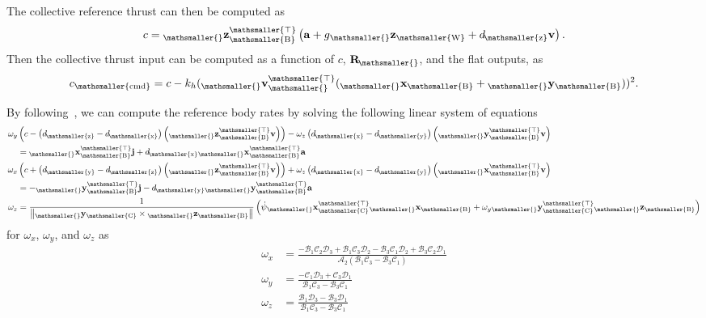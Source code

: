 \documentclass[10pt,a4paper,fleqn]{article}
\newcommand{\vel}[0]{\bVec{v}} %
\newcommand{\acc}[0]{\bVec{a}} %
\newcommand{\jerk}[0]{\bVec{j}} %
\newcommand{\bVec}[1]{\mathbf{#1}}
\newcommand{\norm}[1]{\left\lVert#1\right\rVert}
\newcommand{\vect}[3]{{_{\mathsmaller{\mathrm{#2}}}\mathbf{#1}_{\mathsmaller{\mathrm{#3}}}}} %
\newcommand{\vecttrans}[3]{{_{\mathsmaller{\mathrm{#2}}}\mathbf{#1}_{\mathsmaller{\mathrm{#3}}}^{\mathsmaller{\top}}}} %
\newcommand{\wfr}[0]{\ensuremath{W}} %
\newcommand{\bfr}[0]{\ensuremath{B}} %
\newcommand{\cfr}[0]{\ensuremath{C}} %
\newcommand{\gravacc}[0]{\ensuremath{g}} %
\newcommand{\ori}[1]{\bVec{R}_{\!\mathsmaller{\mathrm{#1}}}} %
\newcommand{\heading}[0]{\psi} %
\newcommand{\bodyrate}[0]{\omega} %
\newcommand{\thrust}[0]{c} %
\newcommand{\horzthrustcoeff}[0]{k_h} %
\newcommand{\dragcoeff}[1]{\ensuremath{d}_{\!\mathsmaller{\mathrm{#1}}}} %
\begin{document}
The collective reference thrust can then be computed as
%
\begin{equation}
	\thrust = \vecttrans{z}{}{\bfr} \left( \acc + \gravacc \vect{z}{}{\wfr} + \dragcoeff{z} \vel \right) .
\end{equation}
%
Then the collective thrust input can be computed as a function of $\thrust$, $\ori{}$, and the flat outputs, as
%
\begin{equation}
	\thrust_{\mathsmaller{\mathrm{cmd}}} = \thrust - \horzthrustcoeff (\vecttrans{v}{}{}( \vect{x}{}{\bfr} + \vect{y}{}{\bfr}))^2 .
\end{equation}

By following~\cite{Faessler18ral}, we can compute the reference body rates by solving the following linear system of equations
%
\begin{align}
	\bodyrate_y & \left( \thrust - \left( \dragcoeff{z} - \dragcoeff{x} \right) \left( \vecttrans{z}{}{\bfr} \vel \right) \right) - \bodyrate_z \left( \dragcoeff{x} - \dragcoeff{y} \right) \left( \vecttrans{y}{}{\bfr} \vel \right) \nonumber \\
	\quad &= \vecttrans{x}{}{\bfr} \jerk + \dragcoeff{x} \vecttrans{x}{}{\bfr} \acc \label{eq:rate_lin_sys_of_eq_x}  \\
	\bodyrate_x & \left( \thrust + \left( \dragcoeff{y} - \dragcoeff{z} \right) \left( \vecttrans{z}{}{\bfr} \vel \right) \right) + \bodyrate_z \left( \dragcoeff{x} - \dragcoeff{y} \right) \left( \vecttrans{x}{}{\bfr} \vel \right) \nonumber \\
	\quad &= -\vecttrans{y}{}{\bfr} \jerk - \dragcoeff{y} \vecttrans{y}{}{\bfr} \acc \label{eq:rate_lin_sys_of_eq_y} \\
	\bodyrate_z &= \frac{1}{\norm{\vect{y}{}{\cfr} \times \vect{z}{}{\bfr}}} \left( \dot{\heading} \vecttrans{x}{}{\cfr} \vect{x}{}{\bfr} + \bodyrate_y \vecttrans{y}{}{\cfr} \vect{z}{}{\bfr} \right) \label{eq:rate_lin_sys_of_eq_z} 
\end{align}
%
for $\bodyrate_x$, $\bodyrate_y$, and $\bodyrate_z$ as
%
\begin{align}
	\bodyrate_x &= \frac{
		- \mathcal{B}_1 \mathcal{C}_2 \mathcal{D}_3	+	
		\mathcal{B}_1 \mathcal{C}_3 \mathcal{D}_2 -
		\mathcal{B}_3 \mathcal{C}_1 \mathcal{D}_2 +
		\mathcal{B}_3 \mathcal{C}_2 \mathcal{D}_1}
		{\mathcal{A}_2 \left( \mathcal{B}_1 \mathcal{C}_3 -
		\mathcal{B}_3 \mathcal{C}_1 \right)} \label{eq:omega_x_computation} \\
	\bodyrate_y &= \frac{
		- \mathcal{C}_1 \mathcal{D}_3 + \mathcal{C}_3 \mathcal{D}_1 }
		{\mathcal{B}_1 \mathcal{C}_3 - \mathcal{B}_3 \mathcal{C}_1} \\
	\bodyrate_z &= \frac{
		\mathcal{B}_1 \mathcal{D}_3 - \mathcal{B}_3 \mathcal{D}_1}
		{\mathcal{B}_1 \mathcal{C}_3 - \mathcal{B}_3 \mathcal{C}_1} \label{eq:omega_z_computation}
\end{align}
\end{document}
